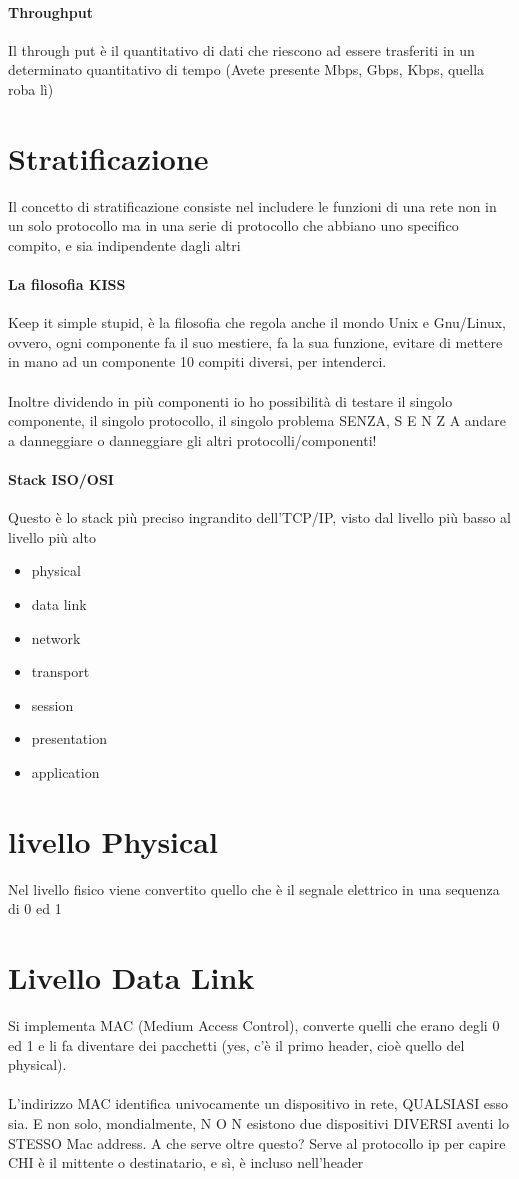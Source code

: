 \documentclass[12pt, a4paper, openany, twoside]{book}
\begin{document}
\paragraph{Throughput}
Il through put è il quantitativo di dati che riescono ad essere trasferiti in 
un determinato quantitativo di tempo (Avete presente Mbps, Gbps, Kbps, quella
roba lì)
\section{Stratificazione}
Il concetto di stratificazione consiste nel includere le funzioni di una rete
non in un solo protocollo ma in una serie di protocollo che abbiano uno
specifico compito, e sia indipendente dagli altri 
\paragraph{La filosofia KISS}
Keep it simple stupid, è la filosofia che regola anche il mondo Unix e Gnu/Linux,
ovvero, ogni componente fa il suo mestiere, fa la sua funzione, evitare di 
mettere in mano ad un componente 10 compiti diversi, per intenderci. 
\\ \\ 
Inoltre dividendo in più componenti io ho possibilità di testare il singolo
componente, il singolo protocollo, il singolo problema SENZA, S E N Z A andare
a danneggiare o danneggiare gli altri protocolli/componenti!
\paragraph{Stack ISO/OSI}
Questo è lo stack più preciso ingrandito dell'TCP/IP, visto dal livello più 
basso al livello più alto
\begin{itemize}
	\item physical
	\item data link
	\item network
	\item transport
	\item session
	\item presentation
	\item application
\end{itemize}
\section{livello Physical}
Nel livello fisico viene convertito quello che è il segnale elettrico in una
sequenza di 0 ed 1
\section{Livello Data Link}
Si implementa MAC (Medium Access Control), converte quelli che erano
degli 0 ed 1 e li fa diventare dei pacchetti (yes, c'è il primo header, cioè 
quello del physical).
\\ \\ 
L'indirizzo MAC identifica univocamente un dispositivo in rete, QUALSIASI esso sia.
E non solo, mondialmente, N O N esistono due dispositivi DIVERSI aventi lo STESSO
Mac address. A che serve oltre questo? Serve al protocollo ip per capire CHI
è il mittente o destinatario, e sì, è incluso nell'header
\end{document}
